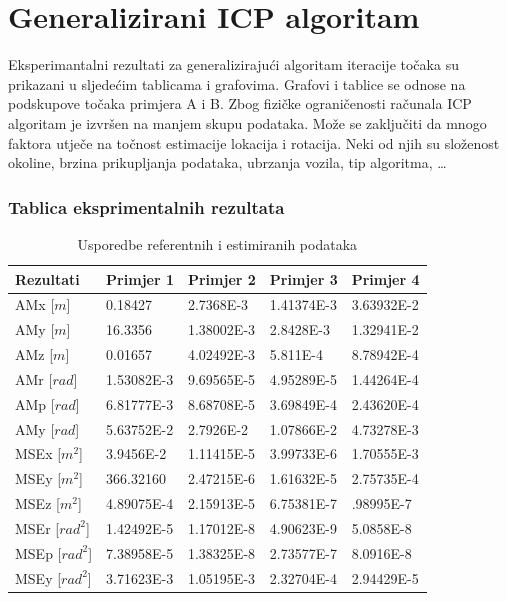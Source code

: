 \section{Generalizirani ICP algoritam}
Eksperimantalni rezultati za generalizirajući algoritam iteracije točaka su prikazani u sljedećim tablicama i grafovima. Grafovi i tablice se odnose na podskupove točaka primjera A i B. Zbog fizičke ograničenosti računala ICP algoritam je izvršen na manjem skupu podataka. Može se zaključiti da mnogo faktora utječe na točnost estimacije lokacija i rotacija. Neki od njih su složenost okoline, brzina prikupljanja podataka, ubrzanja vozila, tip algoritma, \dots

\subsubsection{Tablica eksprimentalnih rezultata}
\begin{table}[H]
  \centering
  \begin{tabular}{ |p{3cm}| |p{2cm}|p{2cm}|p{2cm}|p{2cm}| }
    \hline
    Rezultati& Primjer 1& Primjer 2&Primjer 3& Primjer 4\\
    \hline
    AMx [$m$]& 0.18427& 2.7368E-3& 1.41374E-3& 3.63932E-2\\
    AMy [$m$]&  16.3356& 1.38002E-3& 2.8428E-3& 1.32941E-2\\
    AMz [$m$]& 0.01657& 4.02492E-3& 5.811E-4& 8.78942E-4\\
    AMr [$rad$]& 1.53082E-3& 9.69565E-5& 4.95289E-5& 1.44264E-4\\
    AMp [$rad$]& 6.81777E-3& 8.68708E-5& 3.69849E-4& 2.43620E-4\\
    AMy [$rad$]& 5.63752E-2& 2.7926E-2& 1.07866E-2& 4.73278E-3\\
    \hline
    MSEx [$m^2$]& 3.9456E-2& 1.11415E-5& 3.99733E-6& 1.70555E-3\\
    MSEy [$m^2$]& 366.32160& 2.47215E-6& 1.61632E-5& 2.75735E-4\\
    MSEz [$m^2$]& 4.89075E-4& 2.15913E-5& 6.75381E-7& .98995E-7\\
    MSEr [$rad^2$]& 1.42492E-5& 1.17012E-8& 4.90623E-9& 5.0858E-8\\
    MSEp [$rad^2$]& 7.38958E-5& 1.38325E-8& 2.73577E-7& 8.0916E-8\\
    MSEy [$rad^2$]& 3.71623E-3& 1.05195E-3& 2.32704E-4& 2.94429E-5\\
    \hline
  \end{tabular}
  \caption{Usporedbe referentnih i estimiranih podataka}
  \label{res:ref_est_table}
\end{table}
\pagebreak
